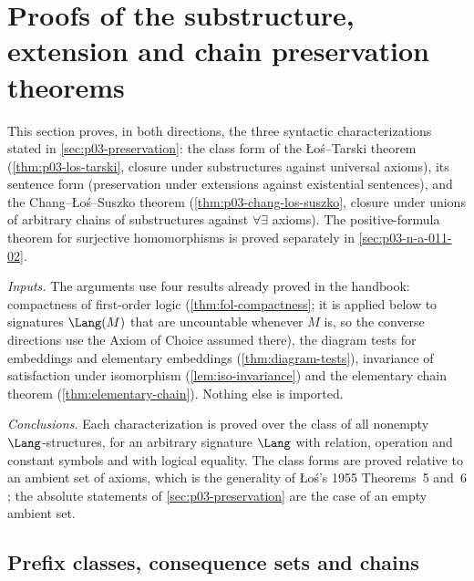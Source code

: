 \section{Proofs of the substructure, extension and chain preservation theorems}
\label{sec:p03-w03-p03-026-preservation-proofs}

This section proves, in both directions, the three syntactic
characterizations stated in \cref{sec:p03-preservation}: the class form of
the \L o\'s--Tarski theorem (\cref{thm:p03-los-tarski}, closure under
substructures against universal axioms), its sentence form (preservation
under extensions against existential sentences), and the
Chang--\L o\'s--Suszko theorem (\cref{thm:p03-chang-los-suszko}, closure under
unions of arbitrary chains of substructures against \(\forall\exists\)
axioms).  The positive-formula theorem for surjective homomorphisms is
proved separately in \cref{sec:p03-n-a-011-02}.

\emph{Inputs.}  The arguments use four results already proved in the
handbook: compactness of first-order logic
(\cref{thm:fol-compactness}; it is applied below to signatures
\(\Lang(M)\) that are uncountable whenever \(M\) is, so the converse
directions use the Axiom of Choice assumed there), the
diagram tests for embeddings and elementary embeddings
(\cref{thm:diagram-tests}), invariance of satisfaction under
isomorphism (\cref{lem:iso-invariance}) and the elementary chain
theorem (\cref{thm:elementary-chain}).  Nothing else is imported.

\emph{Conclusions.}  Each characterization is proved over the class of all
nonempty \(\Lang\)-structures, for an arbitrary signature \(\Lang\) with
relation, operation and constant symbols and with logical equality.  The
class forms are proved relative to an ambient set of axioms, which is the
generality of \L o\'s's 1955 Theorems~5 and~6
\cite[pp.~47--48]{Los1955}; the absolute statements of
\cref{sec:p03-preservation} are the case of an empty ambient set.

\subsection{Prefix classes, consequence sets and chains}
\label{sec:p03-w03-p03-026-conventions}

